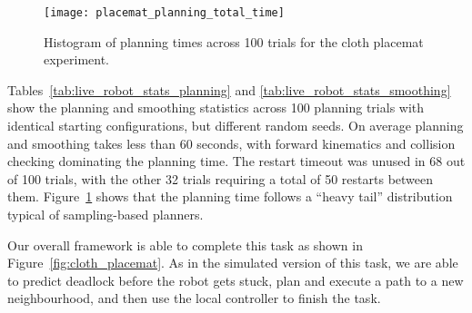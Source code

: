 \begin{figure}
    \centering
    \texttt{[image: placemat\_planning\_total\_time]}
    \caption{Histogram of planning times across 100 trials for the cloth placemat experiment.}
    \label{fig:placemat_planning_time}
\end{figure}

Tables~\ref{tab:live_robot_stats_planning} and \ref{tab:live_robot_stats_smoothing} show the planning and smoothing statistics across 100 planning trials with identical starting configurations, but different random seeds. On average planning and smoothing takes less than 60 seconds, with forward kinematics and collision checking dominating the planning time. The restart timeout was unused in 68 out of 100 trials, with the other 32 trials requiring a total of 50 restarts between them. Figure~\ref{fig:placemat_planning_time} shows that the planning time follows a ``heavy tail'' distribution typical of sampling-based planners.

Our overall framework is able to complete this task as shown in Figure~\ref{fig:cloth_placemat}. As in the simulated version of this task, we are able to predict deadlock before the robot gets stuck, plan and execute a path to a new neighbourhood, and then use the local controller to finish the task.
